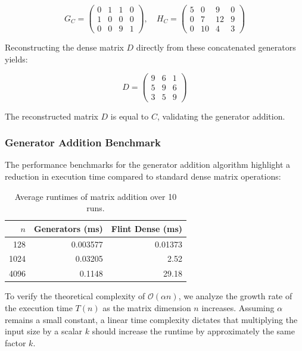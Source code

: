 \begin{equation*}
  G_C =
  \begin{pmatrix} 0 & 1 & 1 & 0 \\ 1 & 0 & 0 & 0 \\ 0 & 0 & 9 & 1
  \end{pmatrix}, \quad
  H_C =
  \begin{pmatrix} 5 & 0 & 9 & 0 \\ 0 & 7 & 12 & 9 \\ 0 & 10 & 4 & 3
  \end{pmatrix}
\end{equation*}

\noindent
Reconstructing the dense matrix $D$ directly from these concatenated
generators yields:

\begin{equation*}
  D =
  \begin{pmatrix} 9 & 6 & 1 \\ 5 & 9 & 6 \\ 3 & 5 & 9
  \end{pmatrix}
\end{equation*}

\noindent
The reconstructed matrix $D$ is equal to $C$, validating
the generator addition.

\subsubsection{Generator Addition Benchmark}

The performance benchmarks for the generator addition algorithm
highlight a reduction in execution time compared to standard dense
matrix operations:

\begin{table}[htpb]
  \centering
  \begin{tabular}{r r r}
    \hline
    $n$  & Generators (ms) & Flint Dense (ms) \\
    \hline
    128  & 0.003577        & 0.01373 \\
    1024 & 0.03205         & 2.52 \\
    4096 & 0.1148          & 29.18 \\
    \hline
  \end{tabular}
  \caption{Average runtimes of matrix addition over 10 runs.}
  \label{tab:bench_add}
\end{table}

To verify the theoretical complexity of $\mathcal{O}(\alpha n)$, we
analyze the growth rate of the execution time $T(n)$ as the matrix
dimension $n$ increases.
Assuming $\alpha$ remains a small constant, a linear time complexity
dictates that multiplying the input size by a scalar $k$ should increase the
runtime by approximately the same factor $k$.

